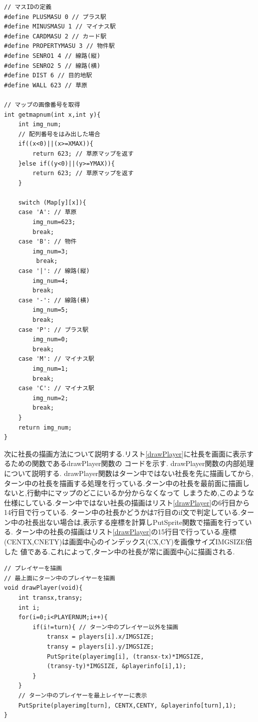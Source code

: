 \documentclass[a4j]{jarticle}
\begin{document}
        \begin{lstlisting}[basicstyle=\ttfamily\footnotesize, frame=single,label=getmapnum,caption=getmapnum関数]
// マスIDの定義
#define PLUSMASU 0 // プラス駅
#define MINUSMASU 1 // マイナス駅
#define CARDMASU 2 // カード駅
#define PROPERTYMASU 3 // 物件駅
#define SENRO1 4 // 線路(縦)
#define SENRO2 5 // 線路(横)
#define DIST 6 // 目的地駅
#define WALL 623 // 草原

// マップの画像番号を取得
int getmapnum(int x,int y){
    int img_num;
    // 配列番号をはみ出した場合
    if((x<0)||(x>=XMAX)){ 
        return 623; // 草原マップを返す
    }else if((y<0)||(y>=YMAX)){
        return 623; // 草原マップを返す
    }

    switch (Map[y][x]){
    case 'A': // 草原
        img_num=623;
        break;
    case 'B': // 物件
        img_num=3;
         break;
    case '|': // 線路(縦)
        img_num=4;
        break; 
    case '-': // 線路(横)
        img_num=5;
        break;
    case 'P': // プラス駅
        img_num=0;
        break;
    case 'M': // マイナス駅
        img_num=1;
        break;
    case 'C': // マイナス駅
        img_num=2;
        break;
    }
    return img_num;
}
        \end{lstlisting}

        次に社長の描画方法について説明する.リスト\ref{drawPlayer}に社長を画面に表示するための関数であるdrawPlayer関数の
        コードを示す. drawPlayer関数の内部処理について説明する. drawPlayer関数はターン中ではない社長を先に描画してから,
        ターン中の社長を描画する処理を行っている.ターン中の社長を最前面に描画しないと,行動中にマップのどこにいるか分からなくなって
        しまうため,このような仕様にしている.ターン中ではない社長の描画はリスト\ref{drawPlayer}の6行目から14行目で行っている. 
        ターン中の社長かどうかは7行目のif文で判定している.ターン中の社長出ない場合は,表示する座標を計算しPutSprite関数で描画を行っている.
        ターン中の社長の描画はリスト\ref{drawPlayer}の15行目で行っている.座標(CENTX,CNETY)は画面中心のインデックス(CX,CY)を画像サイズIMGSIZE倍した
        値である.これによって,ターン中の社長が常に画面中心に描画される.

        \begin{lstlisting}[basicstyle=\ttfamily\footnotesize, frame=single,label=drawPlayer,caption=drawPlayer関数]
// プレイヤーを描画
// 最上面にターン中のプレイヤーを描画
void drawPlayer(void){
    int transx,transy;
    int i;
    for(i=0;i<PLAYERNUM;i++){
        if(i!=turn){ // ターン中のプレイヤー以外を描画
            transx = players[i].x/IMGSIZE;
            transy = players[i].y/IMGSIZE;
            PutSprite(playerimg[i], (transx-tx)*IMGSIZE,
            (transy-ty)*IMGSIZE, &playerinfo[i],1);
        }
    }
    // ターン中のプレイヤーを最上レイヤーに表示
    PutSprite(playerimg[turn], CENTX,CENTY, &playerinfo[turn],1);
}
        \end{lstlisting}
\end{document}
